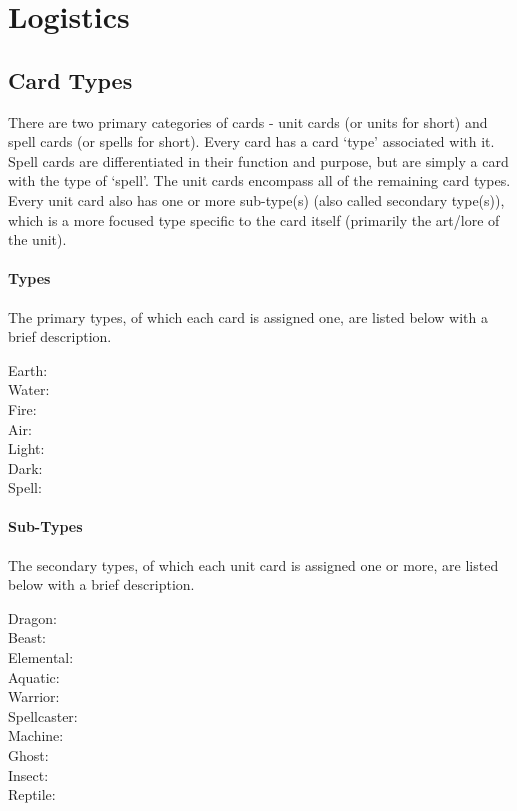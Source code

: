 \chapter{Logistics}





\section{Card Types}

There are two primary categories of cards - unit cards (or units for short) and spell cards (or spells for short). Every card has a card `type' associated with it. Spell cards are differentiated in their function and purpose, but are simply a card with the type of `spell'. The unit cards encompass all of the remaining card types. Every unit card also has one or more sub-type(s) (also called secondary type(s)), which is a more focused type specific to the card itself (primarily the art/lore of the unit).

\subsubsection{Types}
The primary types, of which each card is assigned one, are listed below with a brief description.
\begin{description}
  \item[Earth:]
  \item[Water:]
  \item[Fire:]
  \item[Air:]
  \item[Light:]
  \item[Dark:]
  \item[Spell:]
\end{description}

\subsubsection{Sub-Types}
The secondary types, of which each unit card is assigned one or more, are listed below with a brief description.
\begin{description}
  \item[Dragon:]
  \item[Beast:]
  \item[Elemental:]
  \item[Aquatic:]
  \item[Warrior:]
  \item[Spellcaster:]
  \item[Machine:]
  \item[Ghost:]
  \item[Insect:]
  \item[Reptile:]
\end{description}

